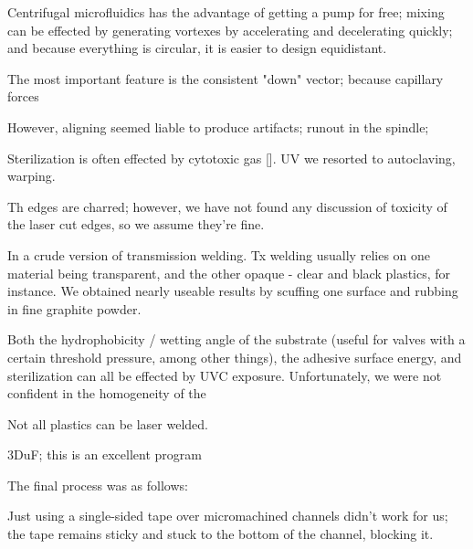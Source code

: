\documentclass[paper.tex]{subfiles}
\begin{document}
Centrifugal microfluidics has the advantage of getting a pump for free; mixing can be effected by generating vortexes by accelerating and decelerating quickly; and because everything is circular, it is easier to design equidistant.

The most important feature is the consistent "down" vector; because capillary forces 

However, aligning seemed liable to produce artifacts; runout in the spindle;


Sterilization is often effected by cytotoxic gas []. UV we resorted to autoclaving, warping.

Th edges are charred; however, we have not found any discussion of toxicity of the laser cut edges, so we assume they're fine.


In a crude version of transmission welding. Tx welding usually relies on one material being transparent, and the other opaque - clear and black plastics, for instance. We obtained nearly useable results by scuffing one surface and rubbing in fine graphite powder.

Both the hydrophobicity / wetting angle of the substrate (useful for valves with a certain threshold pressure, among other things), the adhesive surface energy, and sterilization can all be effected by UVC exposure. Unfortunately, we were not confident in the homogeneity of the 

Not all plastics can be laser welded.

3DuF; this is an excellent program 



The final process was as follows:

Just using a single-sided tape over micromachined channels didn't work for us; the tape remains sticky and stuck to the bottom of the channel, blocking it.
\end{document}
